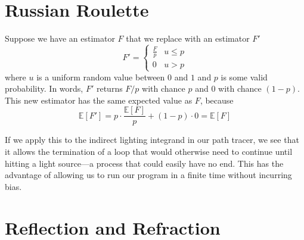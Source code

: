 \documentclass{article}
\begin{document}
\section*{Russian Roulette}

Suppose we have an estimator $F$ that we replace with
an estimator $F'$
\[
	F' = \begin{cases}
		\frac{F}{p} & u \leq p \\
		0 & u > p
	\end{cases}
\]
where $u$ is a uniform random value between $0$ and $1$ and $p$ is some valid probability. In  words, $F'$ returns $F/p$ with chance $p$ and $0$ with chance $(1 - p)$. This new estimator has the same expected value as $F$, because
\[
	\mathbb{E}[F'] = p\cdot\frac{\mathbb{E}[F]}{p} + (1 - p)\cdot0 = \mathbb{E}[F]
\]

If we apply this to the indirect lighting integrand in our path tracer, we see that it allows the termination of a loop that would otherwise need to continue until hitting a light source---a process that could easily have no end. This has the advantage of allowing us to run our program in a finite time without incurring bias.

\section*{Reflection and Refraction}
\end{document}
